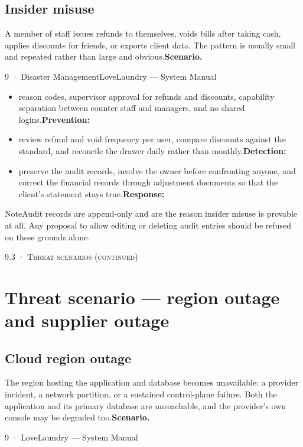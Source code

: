 \documentclass[11pt,a4paper,oneside]{book}
\begin{document}
\subsection*{Insider misuse}
A member of staff issues refunds to themselves, voids bills after taking cash, applies discounts for friends, or exports client data. The pattern is usually small and repeated rather than large and obvious.\textbf{Scenario.}

9 · Disaster ManagementLoveLaundry — System Manual

\begin{itemize}
\item reason codes, supervisor approval for refunds and discounts, capability separation between counter staff and managers, and no shared logins.\textbf{Prevention:}
\item review refund and void frequency per user, compare discounts against the standard, and reconcile the drawer daily rather than monthly.\textbf{Detection:}
\item preserve the audit records, involve the owner before confronting anyone, and correct the financial records through adjustment documents so that the client's statement stays true.\textbf{Response:}
\end{itemize}
\begin{notebox}NoteAudit records are append-only and are the reason insider misuse is provable at all. Any proposal to allow editing or deleting audit entries should be refused on these grounds alone.\end{notebox}
\textsc{\small\color{crimson}9.3 · Threat scenarios (continued)}\par\medskip
\section*{Threat scenario — region outage and supplier outage}
\subsection*{Cloud region outage}
The region hosting the application and database becomes unavailable: a provider incident, a network partition, or a sustained control-plane failure. Both the application and its primary database are unreachable, and the provider's own console may be degraded too.\textbf{Scenario.}

9 · LoveLaundry — System Manual
\end{document}
